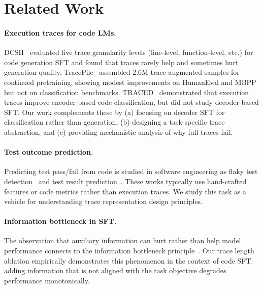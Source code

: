 \documentclass[11pt]{article}
\begin{document}
\section{Related Work}

\paragraph{Execution traces for code LMs.}
DCSH~\citep{ding2024trace} evaluated five trace granularity levels (line-level, function-level, etc.) for code generation SFT and found that traces rarely help and sometimes hurt generation quality.
TracePile~\citep{tracepile2025} assembled 2.6M trace-augmented samples for continued pretraining, showing modest improvements on HumanEval and MBPP but not on classification benchmarks.
TRACED~\citep{traced2024} demonstrated that execution traces improve encoder-based code classification, but did not study decoder-based SFT.
Our work complements these by (a) focusing on decoder SFT for classification rather than generation, (b) designing a task-specific trace abstraction, and (c) providing mechanistic analysis of why full traces fail.

\paragraph{Test outcome prediction.}
Predicting test pass/fail from code is studied in software engineering as flaky test detection~\citep{luo2014empirical} and test result prediction~\citep{bertolino2020learning}. These works typically use hand-crafted features or code metrics rather than execution traces. We study this task as a vehicle for understanding trace representation design principles.

\paragraph{Information bottleneck in SFT.}
The observation that auxiliary information can hurt rather than help model performance connects to the information bottleneck principle~\citep{tishby2000information}. Our trace length ablation empirically demonstrates this phenomenon in the context of code SFT: adding information that is not aligned with the task objective degrades performance monotonically.

\end{document}
